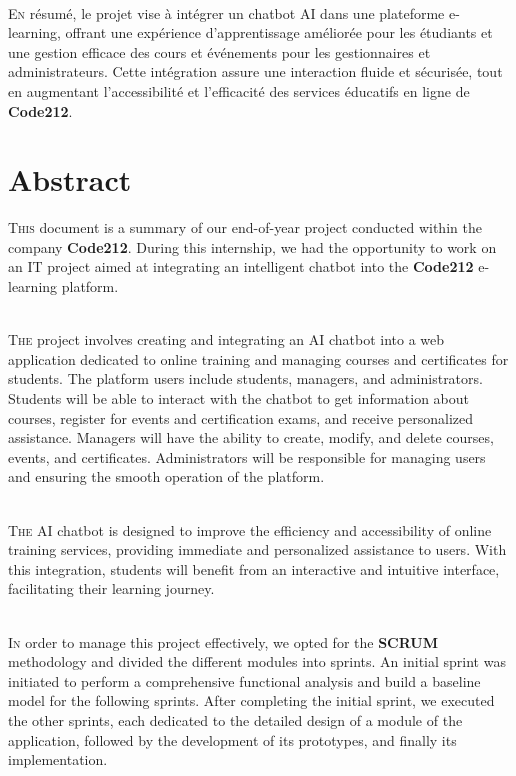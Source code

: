 \documentclass[a4paper, 11pt, openany]{report}
\begin{document}
\ \\

\lettrine[nindent=0em, slope=-.5em]{\color{Eblue}E}{n} résumé, le projet vise à intégrer un chatbot AI dans une plateforme e-learning, offrant une expérience d'apprentissage améliorée pour les étudiants et une gestion efficace des cours et événements pour les gestionnaires et administrateurs. Cette intégration assure une interaction fluide et sécurisée, tout en augmentant l'accessibilité et l'efficacité des services éducatifs en ligne de \textbf{Code212}.

\newpage
\chapter*{Abstract}

\lettrine[nindent=0em, slope=-.5em]{\color{Eblue}T}{his} document is a summary of our end-of-year project conducted within the company \textbf{Code212}. During this internship, we had the opportunity to work on an IT project aimed at integrating an intelligent chatbot into the \textbf{Code212} e-learning platform.

\ \\

\lettrine[nindent=0em, slope=-.5em]{\color{Eblue}T}{he} project involves creating and integrating an AI chatbot into a web application dedicated to online training and managing courses and certificates for students. The platform users include students, managers, and administrators. Students will be able to interact with the chatbot to get information about courses, register for events and certification exams, and receive personalized assistance. Managers will have the ability to create, modify, and delete courses, events, and certificates. Administrators will be responsible for managing users and ensuring the smooth operation of the platform.

\ \\

\lettrine[nindent=0em, slope=-.5em]{\color{Eblue}T}{he} AI chatbot is designed to improve the efficiency and accessibility of online training services, providing immediate and personalized assistance to users. With this integration, students will benefit from an interactive and intuitive interface, facilitating their learning journey.

\ \\

\lettrine[nindent=0em, slope=-.5em]{\color{Eblue}I}{n} order to manage this project effectively, we opted for the \textbf{SCRUM} methodology and divided the different modules into sprints. An initial sprint was initiated to perform a comprehensive functional analysis and build a baseline model for the following sprints. After completing the initial sprint, we executed the other sprints, each dedicated to the detailed design of a module of the application, followed by the development of its prototypes, and finally its implementation.
\end{document}
